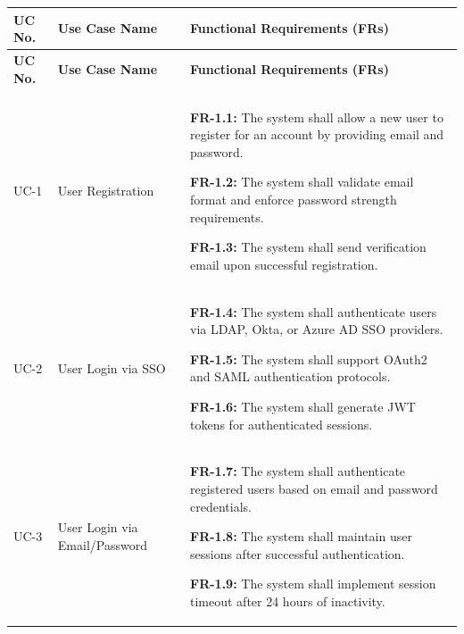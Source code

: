\begin{longtable}{|>{\raggedright\arraybackslash}p{}|>{\raggedright\arraybackslash}p{}|>{\raggedright\arraybackslash}p{}|}
\hline
\textbf{UC No.} & \textbf{Use Case Name} & \textbf{Functional Requirements (FRs)} \\
\hline
\endfirsthead

\hline
\textbf{UC No.} & \textbf{Use Case Name} & \textbf{Functional Requirements (FRs)} \\
\hline
\endhead

\hline \multicolumn{3}{r|}{{Continued on next page}} \\
\hline
\endfoot

\hline
\endlastfoot

UC-1 & User Registration &
\begin{frequirements}
\item \textbf{FR-1.1:} The system shall allow a new user to register for an account by providing email and password.
\item \textbf{FR-1.2:} The system shall validate email format and enforce password strength requirements.
\item \textbf{FR-1.3:} The system shall send verification email upon successful registration.
\end{frequirements} \\
\hline

UC-2 & User Login via SSO &
\begin{frequirements}
\item \textbf{FR-1.4:} The system shall authenticate users via LDAP, Okta, or Azure AD SSO providers.
\item \textbf{FR-1.5:} The system shall support OAuth2 and SAML authentication protocols.
\item \textbf{FR-1.6:} The system shall generate JWT tokens for authenticated sessions.
\end{frequirements} \\
\hline

UC-3 & User Login via Email/Password &
\begin{frequirements}
\item \textbf{FR-1.7:} The system shall authenticate registered users based on email and password credentials.
\item \textbf{FR-1.8:} The system shall maintain user sessions after successful authentication.
\item \textbf{FR-1.9:} The system shall implement session timeout after 24 hours of inactivity.
\end{frequirements} \\
\hline


\end{longtable}
